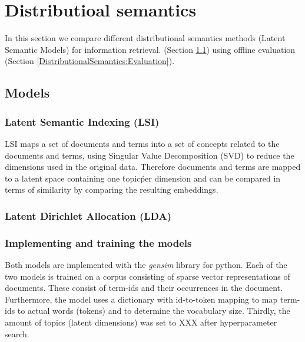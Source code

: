 \section{Distributioal semantics}

In this section we compare different distributional semantics methods (Latent Semantic Models) for information retrieval.
(Section \ref{DistributionalSemantics:Models}) using
offline evaluation (Section \ref{DistributionalSemantics:Evaluation}).

\subsection{Models}
\label{DistributionalSemantics:Models}

\subsubsection{Latent Semantic Indexing (LSI)}
LSI maps a set of documents and terms into a set of concepts related to the documents and terms, using Singular Value Decomposition (SVD) to reduce the dimensions used in the original data. Therefore documents and terms are mapped to a latent space containing one \'topic\' per dimension and can be compared in terms of similarity by comparing the resulting embeddings. 

\subsubsection{Latent Dirichlet Allocation (LDA)}

\subsubsection{Implementing and training the models}
Both models are implemented with the \textit{gensim} library for python. Each of the two models is trained on a corpus consisting of sparse vector representations of documents. These consist of term-ids and their occurrences in the document. Furthermore, the model uses a dictionary with id-to-token mapping to map term-ids to actual words (tokens) and to determine the vocabulary size. Thirdly, the amount of topics (latent dimensions) was set to XXX after hyperparameter search.


